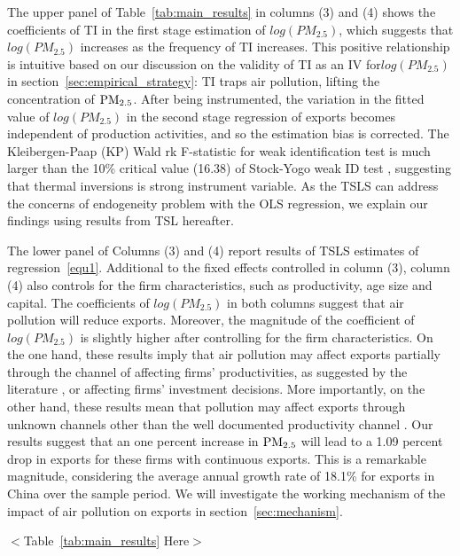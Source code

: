 \documentclass[12pt]{article}
\begin{document}
The upper panel of Table~\ref{tab:main_results} in columns (3) and (4) shows the coefficients of TI in the first stage estimation of $log(PM_{2.5})$, which suggests that $log(PM_{2.5})$ increases as the frequency of TI increases. This positive relationship is intuitive based on our discussion on the validity of TI as an IV for$log(PM_{2.5})$ in section~\ref{sec:empirical_strategy}: TI traps air pollution, lifting the concentration of $\rm PM_{2.5}$. After being instrumented, the variation in the fitted value of  $log(PM_{2.5})$ in the second stage regression of exports becomes independent of production activities, and so the estimation bias is corrected. The
Kleibergen-Paap (KP) Wald rk F-statistic \citep{kleibergen2006generalized} for
weak identification test is much larger than the 10\% critical value (16.38) of Stock-Yogo weak ID test \citep{stock2005asymptotic}, suggesting that thermal inversions is strong
instrument variable.
As the TSLS can address the concerns of endogeneity problem with the OLS regression, we explain our findings using results from TSL hereafter.  

The lower panel of Columns (3) and (4) report results of TSLS
estimates of regression~\ref{equ1}. Additional to the fixed effects controlled in column (3), column (4) also controls for the firm characteristics, such as productivity, age size and capital. The coefficients of $log(PM_{2.5})$ in both columns suggest that air pollution will reduce exports. Moreover, the magnitude of the coefficient of $log(PM_{2.5})$ is slightly higher after controlling for the firm characteristics. On the one hand, these results imply that air pollution may affect exports partially through the channel of affecting firms' productivities, as suggested by the literature \citep{fu2021air}, or affecting firms' investment decisions. More importantly, on the other hand, these results mean that pollution may affect exports through unknown channels other than the well documented productivity channel \cite{fu2021air,khanna2021productivity}. Our results suggest that an one percent increase in $\rm PM_{2.5}$ will lead to a 1.09 percent drop in exports for these firms with continuous exports. This is a remarkable magnitude, considering the average annual growth rate of 18.1\% for exports in China over the sample period. 
We will investigate the working mechanism of the impact of air pollution on exports in section~\ref{sec:mechanism}.    

\begin{center}
  $<$Table~\ref{tab:main_results} Here$>$
  \end{center}
\end{document}

